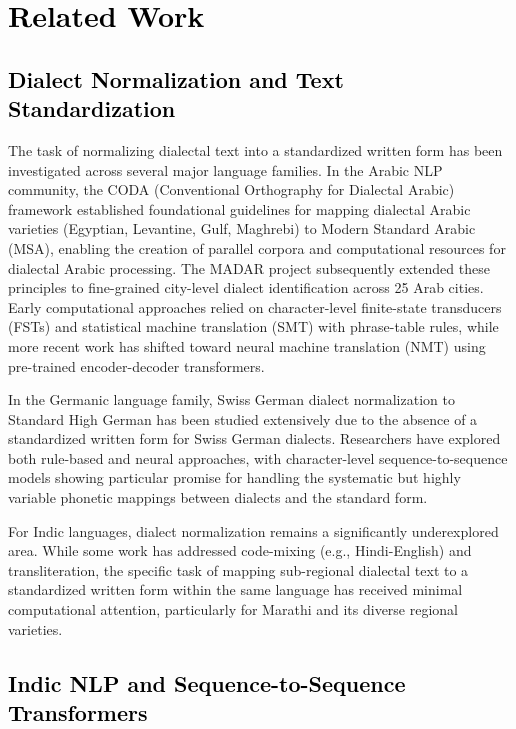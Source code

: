 \section{\textcolor{black}{Related Work}}
\label{sec:related}

\subsection{\textcolor{black}{Dialect Normalization and Text Standardization}}

The task of normalizing dialectal text into a standardized written form has been investigated across several major language families. In the Arabic NLP community, the CODA (Conventional Orthography for Dialectal Arabic) framework \cite{habash2012coda} established foundational guidelines for mapping dialectal Arabic varieties (Egyptian, Levantine, Gulf, Maghrebi) to Modern Standard Arabic (MSA), enabling the creation of parallel corpora and computational resources for dialectal Arabic processing. The MADAR project subsequently extended these principles to fine-grained city-level dialect identification across 25 Arab cities. Early computational approaches relied on character-level finite-state transducers (FSTs) and statistical machine translation (SMT) with phrase-table rules, while more recent work has shifted toward neural machine translation (NMT) using pre-trained encoder-decoder transformers.

In the Germanic language family, Swiss German dialect normalization to Standard High German has been studied extensively due to the absence of a standardized written form for Swiss German dialects. Researchers have explored both rule-based and neural approaches, with character-level sequence-to-sequence models showing particular promise for handling the systematic but highly variable phonetic mappings between dialects and the standard form.

For Indic languages, dialect normalization remains a significantly underexplored area. While some work has addressed code-mixing (e.g., Hindi-English) and transliteration, the specific task of mapping sub-regional dialectal text to a standardized written form within the same language has received minimal computational attention, particularly for Marathi and its diverse regional varieties.

\subsection{\textcolor{black}{Indic NLP and Sequence-to-Sequence Transformers}}

